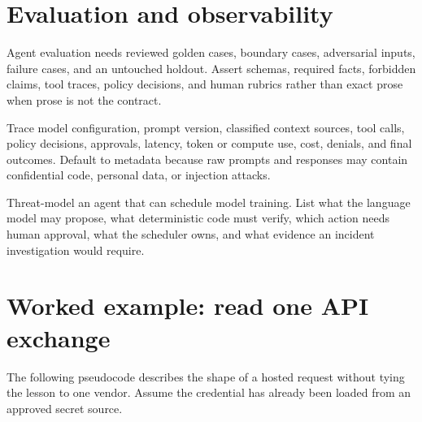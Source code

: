 \section{Evaluation and observability}

Agent evaluation needs reviewed golden cases, boundary cases, adversarial
inputs, failure cases, and an untouched holdout. Assert schemas, required facts,
forbidden claims, tool traces, policy decisions, and human rubrics rather than
exact prose when prose is not the contract.

Trace model configuration, prompt version, classified context sources, tool
calls, policy decisions, approvals, latency, token or compute use, cost, denials,
and final outcomes. Default to metadata because raw prompts and responses may
contain confidential code, personal data, or injection attacks.

\begin{checkpointbox}
Threat-model an agent that can schedule model training. List what the language
model may propose, what deterministic code must verify, which action needs human
approval, what the scheduler owns, and what evidence an incident investigation
would require.
\end{checkpointbox}

\section{Worked example: read one API exchange}

The following pseudocode describes the shape of a hosted request without tying
the lesson to one vendor. Assume the credential has already been loaded from an
approved secret source.


